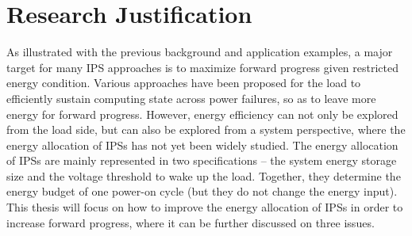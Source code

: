 \section{Research Justification}


As illustrated with the previous background and application examples, a major target for many IPS approaches is to maximize forward progress given restricted energy condition. 
Various approaches have been proposed for the load to efficiently sustain computing state across power failures, so as to leave more energy for forward progress. 
However, energy efficiency can not only be explored from the load side, but can also be explored from a system perspective, where the energy allocation of IPSs has not yet been widely studied. 
The energy allocation of IPSs are mainly represented in two specifications -- the system energy storage size and the voltage threshold to wake up the load. 
Together, they determine the energy budget of one power-on cycle (but they do not change the energy input). 
This thesis will focus on how to improve the energy allocation of IPSs in order to increase forward progress, where it can be further discussed on three issues. 


